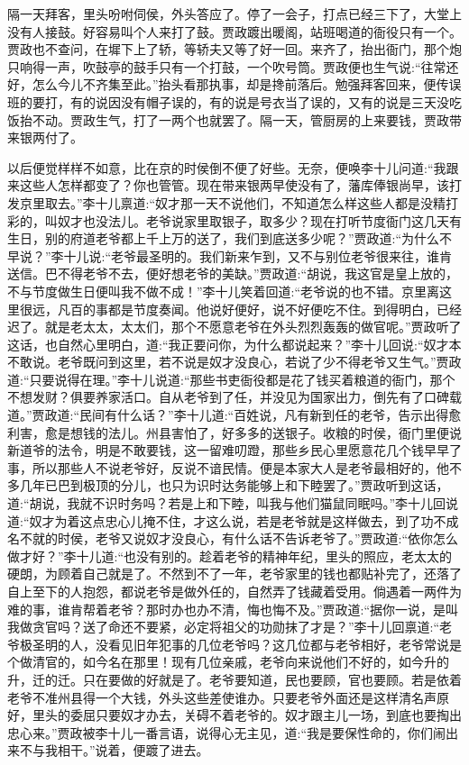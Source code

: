 \begin{parag}
    隔一天拜客，里头吩咐伺侯，外头答应了。停了一会子，打点已经三下了，大堂上没有人接鼓。好容易叫个人来打了鼓。贾政踱出暖阁，站班喝道的衙役只有一个。贾政也不查问，在墀下上了轿，等轿夫又等了好一回。来齐了，抬出衙门，那个炮只响得一声，吹鼓亭的鼓手只有一个打鼓，一个吹号筒。贾政便也生气说:“往常还好，怎么今儿不齐集至此。”抬头看那执事，却是搀前落后。勉强拜客回来，便传误班的要打，有的说因没有帽子误的，有的说是号衣当了误的，又有的说是三天没吃饭抬不动。贾政生气，打了一两个也就罢了。隔一天，管厨房的上来要钱，贾政带来银两付了。
\end{parag}


\begin{parag}
    以后便觉样样不如意，比在京的时侯倒不便了好些。无奈，便唤李十儿问道:“我跟来这些人怎样都变了？你也管管。现在带来银两早使没有了，藩库俸银尚早，该打发京里取去。”李十儿禀道:“奴才那一天不说他们，不知道怎么样这些人都是没精打彩的，叫奴才也没法儿。老爷说家里取银子，取多少？现在打听节度衙门这几天有生日，别的府道老爷都上千上万的送了，我们到底送多少呢？”贾政道:“为什么不早说？”李十儿说:“老爷最圣明的。我们新来乍到，又不与别位老爷很来往，谁肯送信。巴不得老爷不去，便好想老爷的美缺。”贾政道:“胡说，我这官是皇上放的，不与节度做生日便叫我不做不成！”李十儿笑着回道:“老爷说的也不错。京里离这里很远，凡百的事都是节度奏闻。他说好便好，说不好便吃不住。到得明白，已经迟了。就是老太太，太太们，那个不愿意老爷在外头烈烈轰轰的做官呢。”贾政听了这话，也自然心里明白，道:“我正要问你，为什么都说起来？”李十儿回说:“奴才本不敢说。老爷既问到这里，若不说是奴才没良心，若说了少不得老爷又生气。”贾政道:“只要说得在理。”李十儿说道:“那些书吏衙役都是花了钱买着粮道的衙门，那个不想发财？俱要养家活口。自从老爷到了任，并没见为国家出力，倒先有了口碑载道。”贾政道:“民间有什么话？”李十儿道:“百姓说，凡有新到任的老爷，告示出得愈利害，愈是想钱的法儿。州县害怕了，好多多的送银子。收粮的时侯，衙门里便说新道爷的法令，明是不敢要钱，这一留难叨蹬，那些乡民心里愿意花几个钱早早了事，所以那些人不说老爷好，反说不谙民情。便是本家大人是老爷最相好的，他不多几年已巴到极顶的分儿，也只为识时达务能够上和下睦罢了。”贾政听到这话，道:“胡说，我就不识时务吗？若是上和下睦，叫我与他们猫鼠同眠吗。”李十儿回说道:“奴才为着这点忠心儿掩不住，才这么说，若是老爷就是这样做去，到了功不成名不就的时侯，老爷又说奴才没良心，有什么话不告诉老爷了。”贾政道:“依你怎么做才好？”李十儿道:“也没有别的。趁着老爷的精神年纪，里头的照应，老太太的硬朗，为顾着自己就是了。不然到不了一年，老爷家里的钱也都贴补完了，还落了自上至下的人抱怨，都说老爷是做外任的，自然弄了钱藏着受用。倘遇着一两件为难的事，谁肯帮着老爷？那时办也办不清，悔也悔不及。”贾政道:“据你一说，是叫我做贪官吗？送了命还不要紧，必定将祖父的功勋抹了才是？”李十儿回禀道:“老爷极圣明的人，没看见旧年犯事的几位老爷吗？这几位都与老爷相好，老爷常说是个做清官的，如今名在那里！现有几位亲戚，老爷向来说他们不好的，如今升的升，迁的迁。只在要做的好就是了。老爷要知道，民也要顾，官也要顾。若是依着老爷不准州县得一个大钱，外头这些差使谁办。只要老爷外面还是这样清名声原好，里头的委屈只要奴才办去，关碍不着老爷的。奴才跟主儿一场，到底也要掏出忠心来。”贾政被李十儿一番言语，说得心无主见，道:“我是要保性命的，你们闹出来不与我相干。”说着，便踱了进去。
\end{parag}


